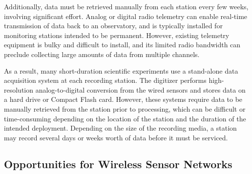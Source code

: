 Additionally, data must be retrieved manually from each station every few
weeks, involving significant effort. Analog or digital radio telemetry can
enable real-time transmission of data back to an observatory, and is
typically installed for monitoring stations intended to be permanent.
However, existing telemetry equipment is bulky and difficult to install, and
its limited radio bandwidth can preclude collecting large amounts of data
from multiple channels.

As a result, many short-duration scientific experiments use a stand-alone
data acquisition system at each recording station. The digitizer performs
high-resolution analog-to-digital conversion from the wired sensors and
stores data on a hard drive or Compact Flash card. However, these systems
require data to be manually retrieved from the station prior to processing,
which can be difficult or time-consuming depending on the location of the
station and the duration of the intended deployment. Depending on the size of
the recording media, a station may record several days or weeks worth of data
before it must be serviced.

\subsection{Opportunities for Wireless Sensor Networks}

